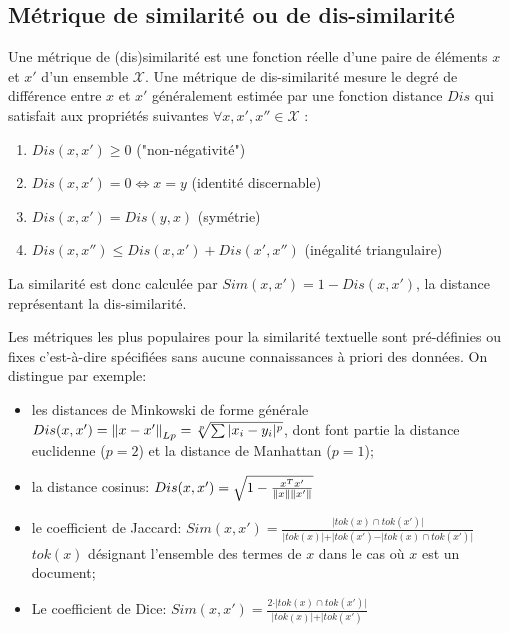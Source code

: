 

\subsection{Métrique de similarité ou de dis-similarité}
Une métrique de (dis)similarité est une fonction réelle d'une paire de éléments $x$ et $x'$ d'un ensemble $\mathcal{X}$. Une métrique de dis-similarité mesure le degré de différence entre $x$ et $x'$  généralement estimée par une fonction distance $Dis$  qui satisfait aux propriétés suivantes $\forall x,x',x'' \in \mathcal{X}$ \citep{wang2015distancemetriclearningsurvey}:
\begin{enumerate}
\item $Dis(x,x') \geq 0$ ("non-négativité")
\item $Dis(x,x') = 0  \Leftrightarrow x = y$ (identité discernable)
\item $Dis(x,x') = Dis(y, x)$ (symétrie)
\item $Dis(x,x'') \leq Dis(x,x') + Dis(x',x'')$ (inégalité triangulaire) \label{enum:sim:ineq-tri}
\end{enumerate}


La similarité est donc calculée par $Sim(x,x') = 1 - Dis(x,x')$, la distance représentant la dis-similarité.

Les métriques les plus populaires pour la similarité textuelle sont pré-définies ou fixes c'est-à-dire spécifiées sans aucune connaissances à priori des données. On distingue par exemple:
\begin{itemize}
	\item les distances de Minkowski de forme générale $Dis(x,x') = \left\lVert x - x'\right\rVert_{Lp} = \sqrt[p]{\sum \vert x_i - y_i \vert ^p}$, dont font partie la distance euclidenne ($p=2$) et la distance de Manhattan ($p=1$); 
	\item la distance cosinus: $Dis(x,x') = \sqrt{1 - \frac{x^Tx'}{\left\lVert x\right\rVert\left\lVert x'\right\rVert}}$
	\item le coefficient de Jaccard: $Sim(x,x') = \frac{\vert tok(x) \cap tok(x') \vert}{\vert tok(x) \vert + \vert tok(x') - \vert tok(x) \cap tok(x') \vert} $ $tok(x)$ désignant l'ensemble des termes de $x$ dans le cas où $x$ est un document;
	\item Le coefficient de Dice: $Sim(x,x') = \frac{2\cdot \vert tok(x) \cap tok(x') \vert}{\vert tok(x) \vert + \vert tok(x')} $
\end{itemize}


